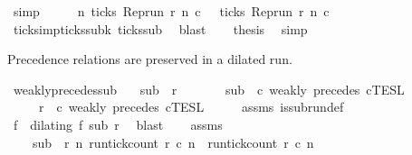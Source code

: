\begin{isabellebody}
\ simp\isanewline
\ \ \isamarkupfalse%
\ \isamarkupfalse%
\ {\isacartoucheopen}{\isasymforall}n{\isachardot}\ ticks\ {\isacharparenleft}{\isacharparenleft}Rep{\isacharunderscore}run\ r{\isacharparenright}\ n\ c\ {\isasymlongrightarrow}\ {\isasymnot}\ ticks\ {\isacharparenleft}{\isacharparenleft}Rep{\isacharunderscore}run\ r{\isacharparenright}\ n\ c\isanewline
\ \ \ \ \isamarkupfalse%
\ ticks{\isacharunderscore}imp{\isacharunderscore}ticks{\isacharunderscore}subk\ ticks{\isacharunderscore}sub\ \isamarkupfalse%
\ blast\isanewline
\ \ \isamarkupfalse%
\ {\isacharquery}thesis\ \isamarkupfalse%
\ simp\isanewline
{}\isamarkupfalse%
%
\endisatagproof
{\isafoldproof}%
%
\isadelimproof
%
\endisadelimproof
%
\begin{isamarkuptext}%
Precedence relations are preserved in a dilated run.%
\end{isamarkuptext}\isamarkuptrue%
\isamarkupfalse%
\ weakly{\isacharunderscore}precedes{\isacharunderscore}sub{\isacharcolon}\isanewline
\ \ \ {\isacartoucheopen}sub\ {\isasymlless}\ r{\isacartoucheclose}\isanewline
\ \ \ \ \ \ \ {\isacartoucheopen}sub\ {\isasymin}\ {\isasymlbrakk}c\ weakly\ precedes\ c\isactrlsub T\isactrlsub E\isactrlsub S\isactrlsub L{\isacartoucheclose}\isanewline
\ \ \ \ \ {\isacartoucheopen}r\ {\isasymin}\ {\isasymlbrakk}c\ weakly\ precedes\ c\isactrlsub T\isactrlsub E\isactrlsub S\isactrlsub L{\isacartoucheclose}\isanewline
%
\isadelimproof
%
\endisadelimproof
%
\isatagproof
{}\isamarkupfalse%
\ {\isacharminus}\isanewline
\ \ \isamarkupfalse%
\ assms{\isacharparenleft}{}{\isacharparenright}\ is{\isacharunderscore}subrun{\isacharunderscore}def\ \isamarkupfalse%
\ f\ \ {\isacharasterisk}{\isacharcolon}{\isacartoucheopen}dilating\ f\ sub\ r{\isacartoucheclose}\ \isamarkupfalse%
\ blast\isanewline
\ \ \isamarkupfalse%
\ assms{\isacharparenleft}{}{\isacharparenright}\ \isamarkupfalse%
\isanewline
\ \ \ \ {\isacartoucheopen}sub\ {\isasymin}\ {\isacharbraceleft}r{\isachardot}\ {\isasymforall}n{\isachardot}\ {\isacharparenleft}run{\isacharunderscore}tick{\isacharunderscore}count\ r\ c\ n{\isacharparenright}\ {\isasymle}\ {\isacharparenleft}run{\isacharunderscore}tick{\isacharunderscore}count\ r\ c\ n{\isacharparenright}{\isacharbraceright}{\isacartoucheclose}\ \isamarkupfalse%

\end{isabellebody}
